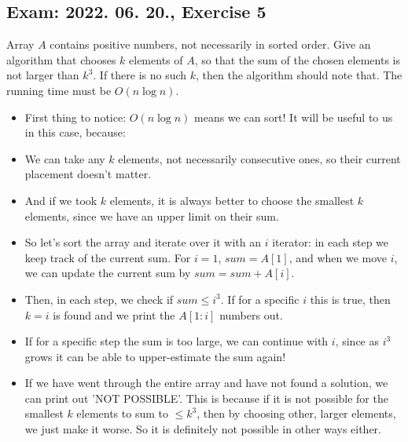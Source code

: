 \subsection{Exam: 2022. 06. 20., Exercise 5}


Array $A$ contains positive numbers, not necessarily in sorted order. Give an algorithm that chooses $k$ elements of $A$, so that the sum of the chosen elements is not larger than $k^3$. If there is no such $k$, then the algorithm should note that. The running time must be $O(n\log{}n)$.


\begin{itemize}
    \item First thing to notice: $O(n\log{}n)$ means we can sort! It will be useful to us in this case, because:
    \item We can take any $k$ elements, not necessarily consecutive ones, so their current placement doesn't matter.
    \item And if we took $k$ elements, it is always better to choose the smallest $k$ elements, since we have an upper limit on their sum.
    \item So let's sort the array and iterate over it with an $i$ iterator: in each step we keep track of the current sum. For $i=1$, $sum=A[1]$, and when we move $i$, we can update the current sum by $sum = sum + A[i]$.
    \item Then, in each step, we check if $sum \leq{} i^3$. If for a specific $i$ this is true, then $k=i$ is found and we print the $A[1:i]$ numbers out.
    \item If for a specific step the sum is too large, we can continue with $i$, since as $i^3$ grows it can be able to upper-estimate the sum again!
    \item If we have went through the entire array and have not found a solution, we can print out 'NOT POSSIBLE'. This is because if it is not possible for the smallest $k$ elements to sum to $\leq{}k^3$, then by choosing other, larger elements, we just make it worse. So it is definitely not possible in other ways either.
\end{itemize}